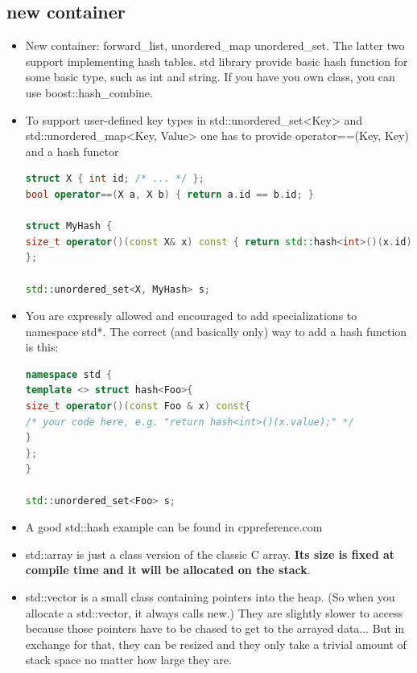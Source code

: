 \documentclass[a4paper,11pt,twoside]{book}
\begin{document}
\subsection{new container}
\begin{itemize}

\item New container: forward\_list, unordered\_map unordered\_set.  The latter two support implementing hash tables. std library provide basic hash function for some basic type, such as int and string. If you have you own class, you can use boost::hash\_combine. 

\item To support user-defined key types in std::unordered\_set<Key> and std::unordered\_map<Key, Value> one has to provide operator==(Key, Key) and a hash functor
\begin{lstlisting}[frame=single, language=c++]
struct X { int id; /* ... */ };
bool operator==(X a, X b) { return a.id == b.id; }

struct MyHash {
size_t operator()(const X& x) const { return std::hash<int>()(x.id); }
};

std::unordered_set<X, MyHash> s;
\end{lstlisting}

\item You are expressly allowed and encouraged to add specializations to namespace std*. The correct (and basically only) way to add a hash function is this:
\begin{lstlisting}[frame=single, language=c++]
namespace std {
template <> struct hash<Foo>{
size_t operator()(const Foo & x) const{
/* your code here, e.g. "return hash<int>()(x.value);" */
}
};
}

std::unordered_set<Foo> s;
\end{lstlisting}
\item A good std::hash example can be found in cppreference.com 

\item std::array is just a class version of the classic C array. \textbf{Its size is fixed at compile time and it will be allocated  on the stack}.

\item std::vector is a small class containing pointers into the heap. (So when you allocate a std::vector, it always calls new.) They are slightly slower to access because those pointers have to be chased to get to the arrayed data... But in exchange for that, they can be resized and they only take a trivial amount of stack space no matter how large they are.



\end{itemize}
\end{document}
